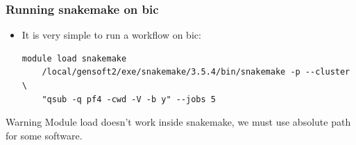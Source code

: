 \documentclass{beamer}
\begin{document}
\begin{frame}[fragile]
    \frametitle{Running snakemake on bic}
    \begin{itemize}
        \item It is very simple to run a workflow on bic:
            \begin{lstlisting}[language={}]
    module load snakemake
    /local/gensoft2/exe/snakemake/3.5.4/bin/snakemake -p --cluster \
    "qsub -q pf4 -cwd -V -b y" --jobs 5
            \end{lstlisting}
    \end{itemize}
    \begin{alertblock}{Warning}
        Module load doesn't work inside snakemake, we must use absolute path for some software.
    \end{alertblock}
\end{frame}
\end{document}
